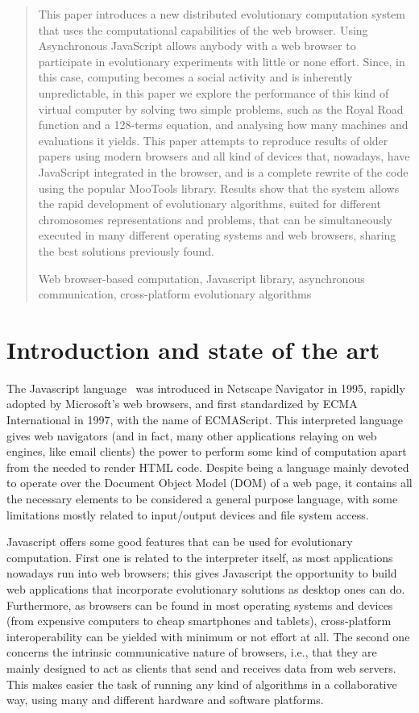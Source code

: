 \documentclass[runningheads,a4paper]{llncs}
\newcommand{\keywords}[1]{\par\addvspace\baselineskip
\noindent\keywordname\enspace\ignorespaces#1}
\begin{document}
\begin{abstract}
This paper introduces a new distributed evolutionary computation system that uses the computational capabilities of the web browser. Using Asynchronous JavaScript allows anybody with a web browser
to participate in evolutionary experiments with little or none effort. Since, in
this case, computing becomes a social activity and is inherently unpredictable, in this paper we  explore the performance of this kind of virtual computer by solving two simple problems, such as the Royal Road function and a 128-terms equation, and analysing how many machines and evaluations it yields. 
This paper attempts to reproduce results of older papers using modern
browsers and all kind of devices that, nowadays, have JavaScript integrated in the browser, and is a complete rewrite of the code using the popular MooTools library. 
Results show that the system allows the rapid development of evolutionary algorithms, suited for different chromosomes representations and problems, that can be simultaneously executed in many different operating systems and web browsers, sharing the best solutions previously found.
\keywords{Web browser-based computation, Javascript library, asynchronous communication, cross-platform evolutionary algorithms	}
\end{abstract}


\section{Introduction and state of the art}
\label{sec:intro}
The Javascript language~\cite{javascript} was introduced in Netscape Navigator in 1995, rapidly adopted by Microsoft's web browsers, and first standardized  by ECMA International in 1997, with the name of ECMAScript. This interpreted language gives web navigators (and in fact, many other applications relaying on web engines, like email clients) the power to perform some kind of computation apart from the needed to render HTML code. Despite being a language mainly devoted to operate over the Document Object Model (DOM) of a web page, it contains all the necessary elements to be considered a general purpose language, with some limitations mostly related to input/output devices and file system access.

Javascript offers some good features that can be used for evolutionary computation. First one is related to the interpreter itself, as most applications nowadays run into web browsers; this gives Javascript the opportunity to build web applications that incorporate evolutionary solutions as desktop ones can do. Furthermore, as browsers can be found in most operating systems and devices (from expensive computers to cheap smartphones and tablets), cross-platform interoperability can be yielded with minimum or not effort at all. The second one concerns the intrinsic communicative nature of browsers, i.e., that they are mainly designed to act as clients that send and receives data from web servers. This makes easier the task of running any kind of algorithms in a collaborative way, using many and different hardware and software platforms. 
\end{document}
